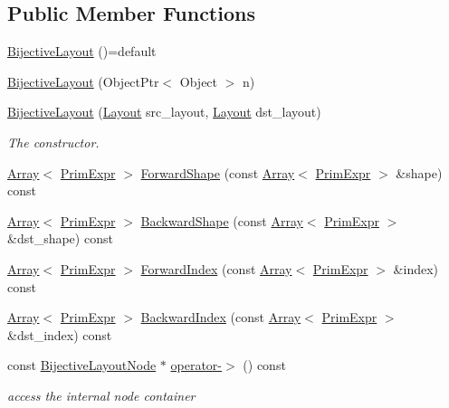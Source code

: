 \subsection*{Public Member Functions}
\begin{DoxyCompactItemize}
\item 
\hyperlink{classtvm_1_1tir_1_1BijectiveLayout_a7fa4784a55b8a262f6854e5750f1bf61}{Bijective\+Layout} ()=default
\item 
\hyperlink{classtvm_1_1tir_1_1BijectiveLayout_a791c28bc770ab7405162b00b06b19944}{Bijective\+Layout} (Object\+Ptr$<$ Object $>$ n)
\item 
\hyperlink{classtvm_1_1tir_1_1BijectiveLayout_a39f754ef4c60c084fb1d0379fbc264c6}{Bijective\+Layout} (\hyperlink{classtvm_1_1tir_1_1Layout}{Layout} src\+\_\+layout, \hyperlink{classtvm_1_1tir_1_1Layout}{Layout} dst\+\_\+layout)
\begin{DoxyCompactList}\small\item\em The constructor. \end{DoxyCompactList}\item 
\hyperlink{classtvm_1_1Array}{Array}$<$ \hyperlink{classtvm_1_1PrimExpr}{Prim\+Expr} $>$ \hyperlink{classtvm_1_1tir_1_1BijectiveLayout_ae5f2483aedcd3b618840545b834f7d50}{Forward\+Shape} (const \hyperlink{classtvm_1_1Array}{Array}$<$ \hyperlink{classtvm_1_1PrimExpr}{Prim\+Expr} $>$ \&shape) const 
\item 
\hyperlink{classtvm_1_1Array}{Array}$<$ \hyperlink{classtvm_1_1PrimExpr}{Prim\+Expr} $>$ \hyperlink{classtvm_1_1tir_1_1BijectiveLayout_a7324c045c1d7293a9d137ab585acb3f2}{Backward\+Shape} (const \hyperlink{classtvm_1_1Array}{Array}$<$ \hyperlink{classtvm_1_1PrimExpr}{Prim\+Expr} $>$ \&dst\+\_\+shape) const 
\item 
\hyperlink{classtvm_1_1Array}{Array}$<$ \hyperlink{classtvm_1_1PrimExpr}{Prim\+Expr} $>$ \hyperlink{classtvm_1_1tir_1_1BijectiveLayout_ae4d61fe098d0aa8f6d0a1e9c904e7005}{Forward\+Index} (const \hyperlink{classtvm_1_1Array}{Array}$<$ \hyperlink{classtvm_1_1PrimExpr}{Prim\+Expr} $>$ \&index) const 
\item 
\hyperlink{classtvm_1_1Array}{Array}$<$ \hyperlink{classtvm_1_1PrimExpr}{Prim\+Expr} $>$ \hyperlink{classtvm_1_1tir_1_1BijectiveLayout_adc3e54d180453d66e64281c425c880e9}{Backward\+Index} (const \hyperlink{classtvm_1_1Array}{Array}$<$ \hyperlink{classtvm_1_1PrimExpr}{Prim\+Expr} $>$ \&dst\+\_\+index) const 
\item 
const \hyperlink{classtvm_1_1tir_1_1BijectiveLayoutNode}{Bijective\+Layout\+Node} $\ast$ \hyperlink{classtvm_1_1tir_1_1BijectiveLayout_ac2efbd7baab4ee14888a30efb6cecbf1}{operator-\/$>$} () const 
\begin{DoxyCompactList}\small\item\em access the internal node container \end{DoxyCompactList}\end{DoxyCompactItemize}


